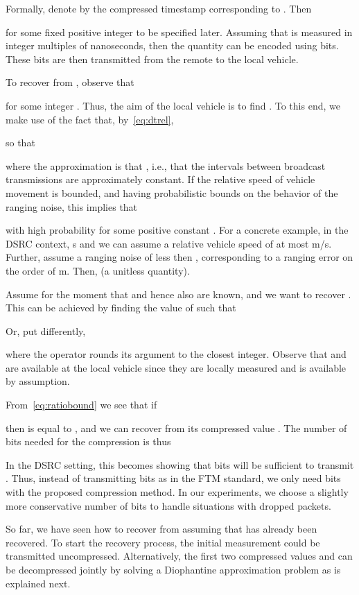 \documentclass[12pt,journal,final,onecolumn]{IEEEtran}
\theoremstyle{definition}
\theoremstyle{myremark}
\begin{document}
Formally, denote by  the compressed timestamp corresponding to
. Then

for some fixed positive integer  to be specified later. Assuming that
 is measured in integer multiples of  nanoseconds, then the
quantity  can be encoded using  bits. These  bits are then
transmitted from the remote to the local vehicle. 

To recover  from , observe that
 
for some integer . Thus, the aim of the local vehicle is to find
. To this end, we make use of the fact that, by~\eqref{eq:dtrel},

so that

where the approximation is that , i.e., that
the intervals between broadcast transmissions are approximately constant.  If
the relative speed of vehicle movement is bounded, and having probabilistic
bounds on the behavior of the ranging noise, this implies that

with high probability for some positive constant .  For a concrete example,
in the DSRC context,  s and we can assume a relative vehicle speed of
at most  m/s. Further, assume a ranging noise  of less then
, corresponding to a ranging error on the order of  m. Then,
 (a unitless quantity).

Assume for the moment that  and hence also  are known, and
we want to recover . This can be achieved by finding the value of
 such that

Or, put differently,

where the operator  rounds its argument to the closest
integer. Observe that  and  are available at the local
vehicle since they are locally measured and  is available by
assumption.

From~\eqref{eq:ratiobound} we see that if

then  is equal to , and we can recover  from its
compressed value . The number of bits needed for the compression is
thus


In the DSRC setting, this becomes  showing that  bits will be
sufficient to transmit . Thus, instead of transmitting  bits as
in the FTM standard, we only need  bits with the proposed compression
method. In our experiments, we choose a slightly more conservative number of  bits to handle situations with dropped packets.

So far, we have seen how to recover  from  assuming that
 has already been recovered. To start the recovery process, the
initial measurement  could be transmitted uncompressed. Alternatively,
the first two compressed values  and  can be decompressed
jointly by solving a Diophantine approximation problem as is explained next.
\end{document}
